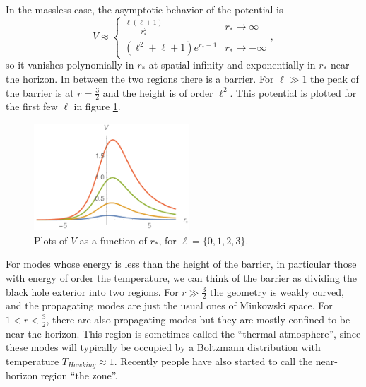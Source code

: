 \documentclass[12pt]{article}
\newcommand{\be}{\begin{equation}}
\newcommand{\ee}{\end{equation}}
\begin{document}
In the massless case, the asymptotic behavior of the potential is
\be
V\approx
\begin{cases}
\frac{\ell(\ell+1)}{r_*^2} & r_*\to \infty\\
(\ell^2+\ell+1)e^{r_*-1} & r_* \to -\infty
\end{cases},
\ee
so it vanishes polynomially in $r_*$ at spatial infinity and exponentially in $r_*$ near the horizon.  In between the two regions there is a barrier.  For $\ell \gg 1$ the peak of the barrier is at $r=\frac{3}{2}$ and the height is of order $\ell^2$.  This potential is plotted for the first few $\ell$ in figure \ref{potentials}.
\begin{figure}
\begin{center}
\includegraphics[height=4cm]{potentials.pdf}
\caption{Plots of $V$ as a function of $r_*$, for $\ell=\{0,1,2,3\}$.}\label{potentials} 
\end{center}
\end{figure}

For modes whose energy is less than the height of the barrier, in particular those with energy of order the temperature, we can think of the barrier as dividing the black hole exterior into two regions.  For $r\gg \frac{3}{2}$ the geometry is weakly curved, and the propagating modes are just the usual ones of Minkowski space.  For $1<r<\frac{3}{2}$, there are also propagating modes but they are mostly confined to be near the horizon.  This region is sometimes called the ``thermal atmosphere'', since these modes will typically be occupied by a Boltzmann distribution with temperature $T_{\mathit{Hawking}}\approx 1$.  Recently people have also started to call the near-horizon region ``the zone''.  
\end{document}
